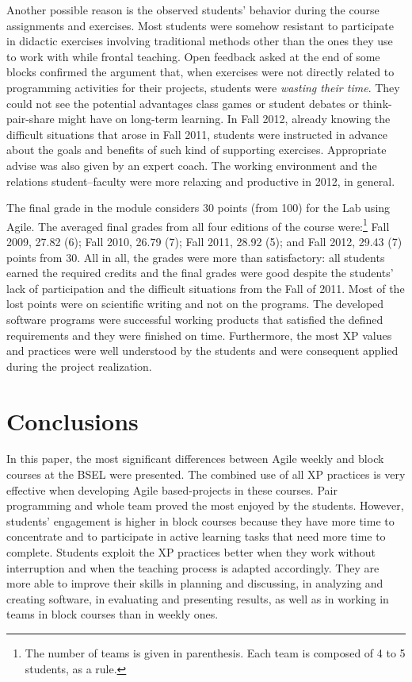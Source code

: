 \documentclass[conference]{IEEEtran}
\begin{document}
Another possible reason is the observed students' behavior during the course assignments and exercises. Most students were somehow resistant to participate in didactic exercises involving traditional methods other than the ones they use to work with while frontal teaching. Open feedback asked at the end of some blocks confirmed the argument that, when exercises were not directly related to programming activities for their projects, students were \textit{wasting their time}. They could not see the potential advantages class games or student debates or think-pair-share might have on long-term learning. In Fall 2012, already knowing the difficult situations that arose in Fall 2011, students were instructed in advance about the goals and benefits of such kind of supporting exercises. Appropriate advise was also given by an expert coach. The working environment and the relations student--faculty were more relaxing and productive in 2012, in general.

The final grade in the module considers 30 points (from 100) for the Lab using Agile. The averaged final grades from all four editions of the course were:\footnote{The number of teams is given in parenthesis. Each team is composed of 4 to 5 students, as a rule.} Fall 2009, 27.82 (6); Fall 2010, 26.79 (7); Fall 2011, 28.92 (5); and Fall 2012, 29.43 (7) points from 30. All in all, the grades were more than satisfactory: all students earned the required credits and the final grades were good despite the students' lack of participation and the difficult situations from the Fall of 2011. Most of the lost points were on scientific writing and not on the programs. The developed software programs were successful working products that satisfied the defined requirements and they were finished on time. Furthermore, the most XP values and practices were well understood by the students and were consequent applied during the project realization. 


\section{Conclusions}

In this paper, the most significant differences between Agile weekly and block courses at the BSEL were presented. The combined use of all XP practices is very effective when developing Agile based-projects in these courses. Pair programming and whole team proved the most enjoyed by the students. However, students' engagement is higher in block courses because they have more time to concentrate and to participate in active learning tasks that need more time to complete. Students exploit the XP practices better when they work without interruption and when the teaching process is adapted accordingly. They are more able to improve their skills in planning and discussing, in analyzing and creating software, in evaluating and presenting results, as well as in working in teams in block courses than in weekly ones. 
\end{document}
